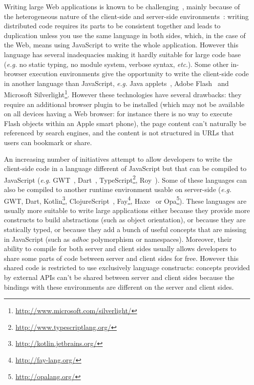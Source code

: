 \documentclass[american,english,runningheads]{llncs}
\newcommand{\eg}{\emph{e.g.}}
\newcommand{\etc}{\emph{etc.}}
\begin{document}
Writing large Web applications is known to be challenging~\cite{Mikkonen08_SpaghettiJs,Preciado05_RIAMethodologyNecessity}, mainly because of the heterogeneous nature of the client-side and server-side environments~\cite{Echeverria09_RIA,Kuuskeri09_PartitioningClientServer}: writing distributed code requires its parts to be consistent together and leads to duplication unless you use the same language in both sides, which, in the case of the Web, means using JavaScript to write the whole application. However this language has several inadequacies making it hardly suitable for large code base (\eg{} no static typing, no module system, verbose syntax, \etc). Some other in-browser execution environments give the opportunity to write the client-side code in another language than JavaScript, \eg{} Java applets~\cite{Anuff96_JavaApplets}, Adobe Flash~\cite{Curtis00_Flash} and Microsoft Silverlight\footnote{\href{http://www.microsoft.com/silverlight/}{http://www.microsoft.com/silverlight/}}. 
However these technologies have several drawbacks: they require an additional browser plugin to be installed (which may not be available on all devices having a Web browser: for instance there is no way to execute Flash objects within an Apple smart phone), the page content can't naturally be referenced by search engines, and the content is not structured in URLs that users can bookmark or share.

An increasing number of initiatives attempt to allow developers to write the client-side code in a language different of JavaScript but that can be compiled to JavaScript (\eg{} GWT~\cite{Chaganti07_GWT}, Dart~\cite{Griffith11_Dart}, TypeScript\footnote{\href{http://www.typescriptlang.org/}{http://www.typescriptlang.org/}}, Roy~\cite{McKenna_Roy}). Some of these languages can also be compiled to another runtime environment usable on server-side (\eg{} GWT, Dart, Kotlin\footnote{\href{http://kotlin.jetbrains.org/}{http://kotlin.jetbrains.org/}}, ClojureScript~\cite{McGranaghan11_ClojureScript}, Fay\footnote{\href{http://fay-lang.org/}{http://fay-lang.org/}}, Haxe~\cite{Cannasse08_HaXe} or Opa\footnote{\href{http://opalang.org/}{http://opalang.org/}}). These languages are usually more suitable to write large applications either because they provide more constructs to build abstractions (such as object orientation), or because they are statically typed, or because they add a bunch of useful concepts that are 
missing in JavaScript (such as \emph{adhoc} polymorphism or namespaces). Moreover, their ability to compile for both server and client sides usually allows developers to share some parts of code between server and client sides for free. However this shared code is restricted to use exclusively language constructs: concepts provided by external APIs can't be shared between server and client sides because the bindings with these environments are different on the server and client sides.
\end{document}
